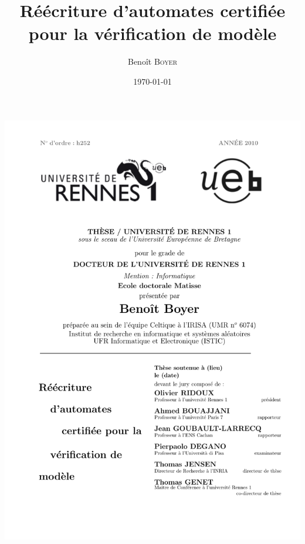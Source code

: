 \documentclass[a4paper, 12pt]{memoir}
\begin{document}
\vspace*{-4cm}\begin{minipage}{1.5\linewidth}
  \hspace*{-3cm}\includegraphics[width=20.4cm]{couverture/couverture}
\end{minipage}

 \title{Réécriture d'automates certifiée pour la vérification de modèle}
 \author{Benoît \textsc{Boyer}}
 \date{\today}
 \maketitle
% 
\frontmatter
\tableofcontents
\mainmatter

\end{document}
